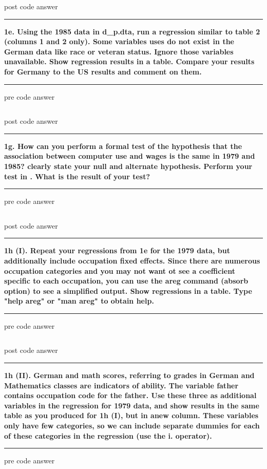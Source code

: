 \documentclass[12pt]{article}
\newcommand\question[1]{\vspace{1em}\hrule\vspace{1em}\textbf{#1}\vspace{1em}\hrule\vspace{1em}}
\begin{document}
post code answer

\newpage
\question{1e. Using the 1985 data in d\_p.dta, run a regression similar to \cite{Krueger1993} table 2 (columns 1 and 2 only). Some variables \cite{Krueger1993} uses do not exist in the German data like race or veteran status. Ignore those variables unavailable. Show regression results in a table. Compare your results for Germany to the US results and comment on them.}
pre code answer

\begin{lstlisting}
\end{lstlisting}

post code answer

\newpage
\question{1g. How can you perform a formal test of the hypothesis that the association between computer use and wages is the same in 1979 and 1985? clearly state your null and alternate hypothesis. Perform your test in \stata. What is the result of your test?}
pre code answer

\begin{lstlisting}
\end{lstlisting}

post code answer

\newpage
\question{1h (I). Repeat your regressions from 1e for the 1979 data, but additionally include occupation fixed effects. Since there are numerous occupation categories and you may not want ot see a coefficient specific to each occupation, you can use the areg command (absorb option) to see a simplified output. Show regressions in a table. Type "help areg" or "man areg" to obtain help.}
pre code answer

\begin{lstlisting}
\end{lstlisting}

post code answer

\newpage
\question{1h (II). German and math scores, referring to grades in German and Mathematics classes are indicators of ability. The variable father contains occupation code for the father. Use these three as additional variables in the regression for 1979 data, and show results in the same table as you produced for 1h (I), but in anew column. These variables only have few categories, so we can include separate dummies for each of these categories in the regression (use the i. operator).}
pre code answer

\begin{lstlisting}
\end{lstlisting}
\end{document}
